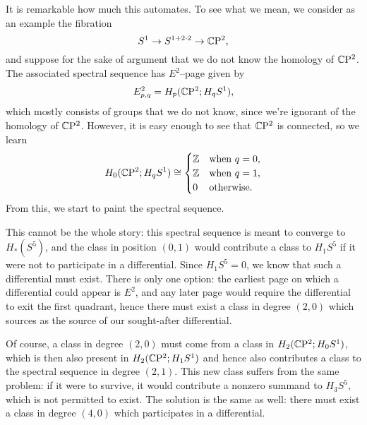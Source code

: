 \begin{example}\label{HomologicalCP2SSeq}%
It is remarkable how much this automates.
To see what we mean, we consider as an example the fibration \[S^1 \to S^{1 + 2 \cdot 2} \to \mathbb C \mathrm{P}^2,\] and suppose for the sake of argument that we do not know the homology of $\mathbb C \mathrm{P}^2$.
The associated spectral sequence has $E^2$--page given by \[E^2_{p, q} = H_p(\mathbb C \mathrm{P}^2; H_q S^1),\] which mostly consists of groups that we do not know, since we're ignorant of the homology of $\mathbb C \mathrm{P}^2$.
However, it is easy enough to see that $\mathbb C \mathrm{P}^2$ is connected, so we learn \[H_0(\mathbb C \mathrm{P}^2; H_q S^1) \cong \begin{cases} \mathbb Z & \text{when $q = 0$}, \\ \mathbb Z & \text{when $q = 1$}, \\ 0 & \text{otherwise}. \end{cases}\]
From this, we start to paint the spectral sequence.

\noindent
This cannot be the whole story: this spectral sequence is meant to converge to $H_*(S^5)$, and the class in position $(0, 1)$ would contribute a class to $H_1 S^5$ if it were not to participate in a differential.
Since $H_1 S^5 = 0$, we know that such a differential must exist.
There is only one option: the earliest page on which a differential could appear is $E^2$, and any later page would require the differential to exit the first quadrant, hence there must exist a class in degree $(2, 0)$ which sources as the source of our sought-after differential.

Of course, a class in degree $(2, 0)$ must come from a class in $H_2(\mathbb C \mathrm{P}^2; H_0 S^1)$, which is then also present in $H_2(\mathbb C \mathrm{P}^2; H_1 S^1)$ and hence also contributes a class to the spectral sequence in degree $(2, 1)$.
This new class suffers from the same problem: if it were to survive, it would contribute a nonzero summand to $H_3 S^5$, which is not permitted to exist.
The solution is the same as well: there must exist a class in degree $(4, 0)$ which participates in a differential.


\end{example}
